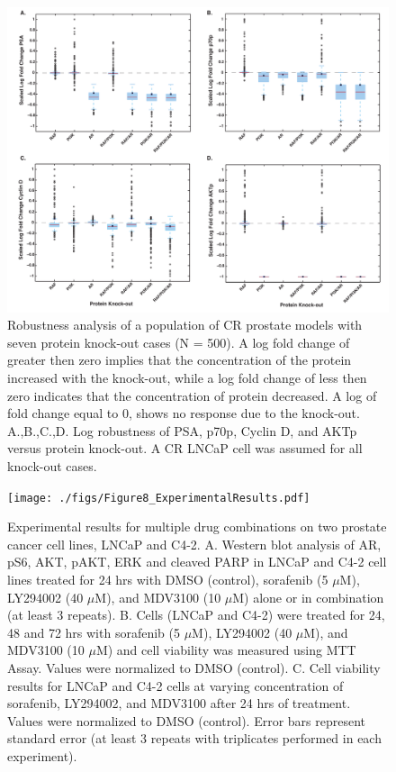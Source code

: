 \documentclass[12pt]{article}
\begin{document}
\begin{figure}\centering
\includegraphics[width=1.0\textwidth]{./figs/Fig_7_BoxPlot_KnockOut_Cases_new.pdf}
\caption{Robustness analysis of a population of CR prostate models with seven protein knock-out cases (N = 500). A log fold change of greater then zero implies that the concentration of the protein increased with the knock-out, while a log fold change of less then zero indicates that the concentration of protein decreased. A log of fold change equal to 0, shows no response due to the knock-out.
 A.,B.,C.,D. Log robustness of PSA, p70p, Cyclin D, and AKTp versus protein knock-out. A CR LNCaP cell was assumed for all knock-out cases.}
\label{fg:Dual_Knockout}
\end{figure}

\clearpage

\begin{figure}\centering
\texttt{[image: ./figs/Figure8\_ExperimentalResults.pdf]}
\caption{Experimental results for multiple drug combinations on two prostate cancer cell lines, LNCaP and C4-2. A. Western blot analysis of AR, pS6, AKT, pAKT, ERK and cleaved PARP in LNCaP and C4-2 cell lines treated for 24 hrs with DMSO (control), sorafenib (5 $\mu$M), LY294002 (40 $\mu$M), and MDV3100 (10 $\mu$M) alone or in combination (at least 3 repeats). B. Cells (LNCaP and C4-2) were treated for 24, 48 and 72 hrs with sorafenib (5 $\mu$M), LY294002 (40 $\mu$M), and MDV3100 (10 $\mu$M) and cell viability was measured using MTT Assay. Values were normalized to DMSO (control). C. Cell viability results for LNCaP and C4-2 cells at varying concentration of sorafenib, LY294002, and MDV3100 after 24 hrs of treatment. Values were normalized to DMSO (control). Error bars represent standard error (at least 3 repeats with triplicates performed in each experiment).}
\label{fg:Experiment}
\end{figure}
\end{document}
